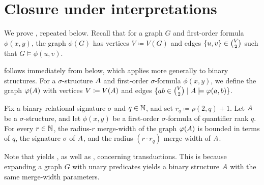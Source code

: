 \section{Closure under interpretations}\label{sec:closure}
We prove , repeated below.
Recall that for a graph  $G$ and first-order formula  $\phi(x,y)$, the graph
 $\phi(G)$ has vertices $V\coloneqq V(G)$ and edges $\{u,v\}\in {V\choose 2}$ such that $G\models\phi(u,v)$.

\introinterp*







 follows immediately  from  below, which applies more generally to binary structures. 
For a $\sigma$-structure ${{A}}$ and first-order $\sigma$-formula $\phi(x,y)$, 
we define the graph $\varphi({{A}})$ with vertices $V\coloneqq V({{A}})$ and edges $\{ab\in {V\choose 2}\mid{{A}}\models\varphi(a,b)\}$. 

\begin{lemma}\label{lem:interp}
  Fix a binary relational signature $\sigma$ and $q\in\mathbb N$, and set $r_q\coloneqq\rho(2,q)+1$. 
  Let ${{A}}$ be a $\sigma$-structure,
  and let $\phi(x,y)$ be a first-order $\sigma$-formula of quantifier rank $q$.
For every $r\in\mathbb N$, the radius-$r$ merge-width of the graph $\varphi({{A}})$ is bounded in terms of $q$, the signature $\sigma$ of ${{A}}$, and the radius-$(r\cdot r_q)$ merge-width of ${{A}}$.
\end{lemma}
Note that  yields , as well as  , concerning transductions. 
This is because expanding a graph $G$ with unary predicates yields a binary structure ${{A}}$ with the same 
merge-width parameters.

